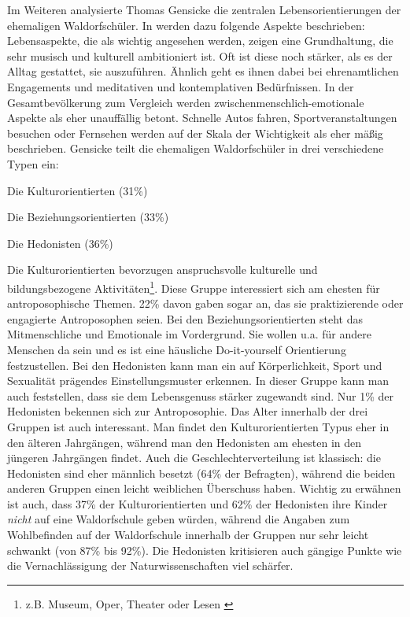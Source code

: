 Im Weiteren analysierte Thomas Gensicke die zentralen Lebensorientierungen der ehemaligen Waldorfschüler. 
In \citet[][S. 17ff]{randoll07} werden dazu folgende Aspekte beschrieben: Lebensaspekte, die als wichtig angesehen werden, zeigen eine Grundhaltung, die sehr musisch und kulturell ambitioniert ist. 
Oft ist diese noch stärker, als es der Alltag gestattet, sie auszuführen. 
Ähnlich geht es ihnen dabei bei ehrenamtlichen Engagements und meditativen und kontemplativen Bedürfnissen. 
In der Gesamtbevölkerung zum Vergleich werden zwischenmenschlich-emotionale Aspekte als eher unauffällig betont. 
Schnelle Autos fahren, Sportveranstaltungen besuchen oder Fernsehen werden auf der Skala der Wichtigkeit als eher mäßig  beschrieben. 
Gensicke teilt die ehemaligen Waldorfschüler in drei verschiedene Typen ein: 
	\begin{compactitem}
		\item Die Kulturorientierten (31\%)
		\item Die Beziehungsorientierten (33\%)
		\item Die Hedonisten (36\%)
	\end{compactitem}

Die Kulturorientierten bevorzugen anspruchsvolle kulturelle und bildungsbezogene Aktivitäten\footnote{z.B. Museum, Oper, Theater oder Lesen \citep[Vgl.][S. 17]{randoll07}}. 
Diese Gruppe interessiert sich am ehesten für antroposophische Themen. 
22\% davon gaben sogar an, das sie praktizierende oder engagierte Antroposophen seien. 
Bei den Beziehungsorientierten steht das Mitmenschliche und Emotionale im Vordergrund. 
Sie wollen u.a. für andere Menschen da sein und es ist eine häusliche Do-it-yourself Orientierung festzustellen. 
Bei den Hedonisten kann man ein auf Körperlichkeit, Sport und Sexualität prägendes Einstellungsmuster erkennen. 
In dieser Gruppe kann man auch feststellen, dass sie dem Lebensgenuss stärker zugewandt sind. 
Nur 1\% der Hedonisten bekennen sich zur Antroposophie. 
Das Alter innerhalb der drei Gruppen ist auch interessant. 
Man findet den Kulturorientierten Typus eher in den älteren Jahrgängen, während man den Hedonisten am ehesten in den jüngeren Jahrgängen findet. 
Auch die Geschlechterverteilung ist klassisch: die Hedonisten sind eher männlich besetzt (64\% der Befragten), während die beiden anderen Gruppen einen leicht weiblichen Überschuss haben. 
Wichtig zu erwähnen ist auch, dass 37\% der Kulturorientierten und 62\% der Hedonisten ihre Kinder \emph{nicht} auf eine Waldorfschule geben würden, während die Angaben zum Wohlbefinden auf der Waldorfschule innerhalb der Gruppen nur sehr leicht schwankt (von 87\% bis 92\%). 
Die Hedonisten kritisieren auch gängige Punkte wie die Vernachlässigung der Naturwissenschaften viel schärfer. 

